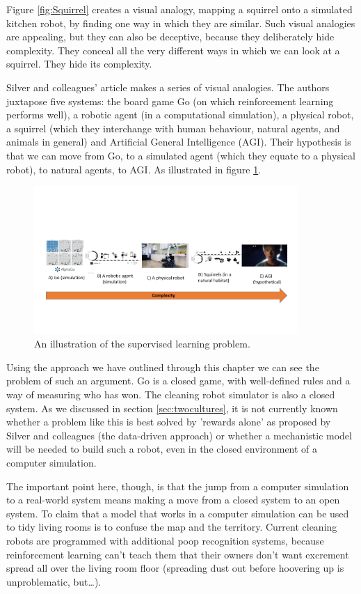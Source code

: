 Figure \ref{fig:Squirrel} creates a visual analogy, mapping a squirrel onto a simulated kitchen robot, by finding one way in which they are similar. Such visual analogies are appealing, but they can also be deceptive, because they deliberately hide complexity. They conceal all the very different ways in which we can look at a squirrel. They hide its complexity. 

Silver and colleagues’ article makes a series of visual analogies. The authors juxtapose five systems: the board game Go (on which reinforcement learning performs well), a robotic agent (in a computational simulation), a physical robot, a squirrel (which they interchange with human behaviour, natural agents, and animals in general) and Artificial General Intelligence (AGI). Their hypothesis is that we can move from Go, to a simulated agent (which they equate to a physical robot), to natural agents, to AGI. As illustrated in figure \ref{fig:ComplexityIncrease}.

\begin{figure}[t]
\centering
\includegraphics[width=10cm]{Figures/Closed/ComplexityIncrease.png}
\centering
\caption{An illustration of the supervised learning problem.   \label{fig:ComplexityIncrease}}
\end{figure}

Using the approach we have outlined through this chapter we can see the problem of such an argument. Go is a closed game, with well-defined rules and a way of measuring who has won. The cleaning robot simulator is also a closed system. As we discussed in section \ref{sec:twocultures}, it is not currently known whether a problem like this is best solved by 'rewards alone' as proposed by Silver and colleagues (the data-driven approach) or whether a mechanistic model will be needed to build such a robot, even in the closed environment of a computer simulation. 

The important point here, though, is that the jump from a computer simulation to a real-world system means making a move from a closed system to an open system. To claim that a model that works in a computer simulation can be used to tidy living rooms is to confuse the map and the territory.
Current cleaning robots are programmed with additional poop recognition systems, because reinforcement learning can’t teach them that their owners don’t want excrement spread all over the living room floor (spreading dust out before hoovering up is unproblematic, but…). 

